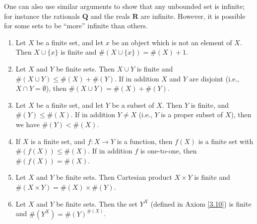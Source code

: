 \begin{remark}\label{3.6.13}
    One can also use similar arguments to show that any unbounded set is infinite;
    for instance the rationals \(\mathbf{Q}\) and the reals \(\mathbf{R}\) are infinite.
    However, it is possible for some sets to be ``more'' infinite than others.
\end{remark}

\begin{proposition}\label{3.6.14}
    \leavevmode
    \begin{enumerate}
        \item Let \(X\) be a finite set, and let \(x\) be an object which is not an element of \(X\).
              Then \(X \cup \{x\}\) is finite and \(\#(X \cup \{x\}) = \#(X) + 1\).
        \item Let \(X\) and \(Y\) be finite sets.
              Then \(X \cup Y\) is finite and \(\#(X \cup Y) \leq \#(X) + \#(Y)\).
              If in addition \(X\) and \(Y\) are disjoint (i.e., \(X \cap Y = \emptyset\)), then \(\#(X \cup Y) = \#(X) + \#(Y)\).
        \item Let \(X\) be a finite set, and let \(Y\) be a subset of \(X\).
              Then \(Y\) is finite, and \(\#(Y) \leq \#(X)\).
              If in addition \(Y \neq X\) (i.e., \(Y\) is a proper subset of \(X\)), then we have \(\#(Y) < \#(X)\).
        \item If \(X\) is a finite set, and \(f : X \to Y\) is a function, then \(f(X)\) is a finite set with \(\#(f(X)) \leq \#(X)\).
              If in addition \(f\) is one-to-one, then \(\#(f(X)) = \#(X)\).
        \item Let \(X\) and \(Y\) be finite sets.
              Then Cartesian product \(X \times Y\) is finite and \(\#(X \times Y) = \#(X) \times \#(Y)\).
        \item Let \(X\) and \(Y\) be finite sets.
              Then the set \(Y^X\) (defined in Axiom \ref{3.10}) is finite and \(\#(Y^X) = \#(Y)^{\#(X)}\).
    \end{enumerate}
\end{proposition}

